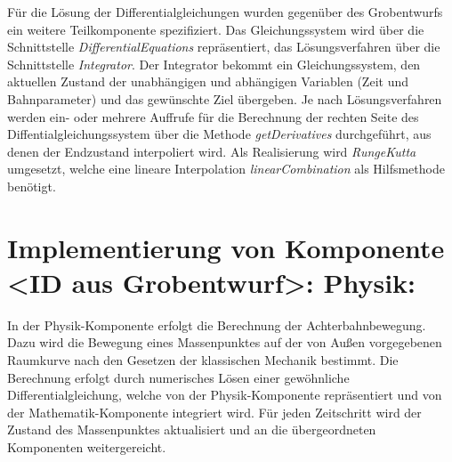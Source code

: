 Für die Lösung der Differentialgleichungen wurden gegenüber des Grobentwurfs ein
weitere Teilkomponente spezifiziert. Das Gleichungssystem wird über die Schnittstelle
\emph{DifferentialEquations} repräsentiert, das Lösungsverfahren über die Schnittstelle
\emph{Integrator}. Der Integrator bekommt ein Gleichungssystem, den aktuellen Zustand
der unabhängigen und abhängigen Variablen (Zeit und Bahnparameter) und das gewünschte
Ziel übergeben. Je nach Lösungsverfahren werden ein- oder mehrere Auffrufe für die
Berechnung der rechten Seite des Diffentialgleichungssystem über die Methode 
\emph{getDerivatives} durchgeführt, aus denen der Endzustand interpoliert wird.
Als Realisierung wird \emph{RungeKutta} umgesetzt, welche eine lineare Interpolation
\emph{linearCombination} als Hilfsmethode benötigt.

\section{Implementierung von Komponente
         <ID aus Grobentwurf>: Physik:}

In der Physik-Komponente erfolgt die Berechnung der Achterbahnbewegung. Dazu wird
die Bewegung eines Massenpunktes auf der von Außen vorgegebenen Raumkurve
nach den Gesetzen der klassischen Mechanik bestimmt. Die Berechnung erfolgt
durch numerisches Lösen einer gewöhnliche Differentialgleichung, welche von der
Physik-Komponente repräsentiert und von der Mathematik-Komponente integriert wird.
Für jeden Zeitschritt wird der Zustand des Massenpunktes aktualisiert und an die
übergeordneten Komponenten weitergereicht.

